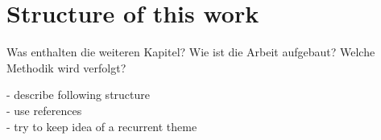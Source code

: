 \section{Structure of this work}
\label{ch:Intoduction:sec:Structure}

Was enthalten die weiteren Kapitel? Wie ist die Arbeit aufgebaut? Welche Methodik wird verfolgt?

- describe following structure\\
- use references\\
- try to keep idea of a recurrent theme\\


